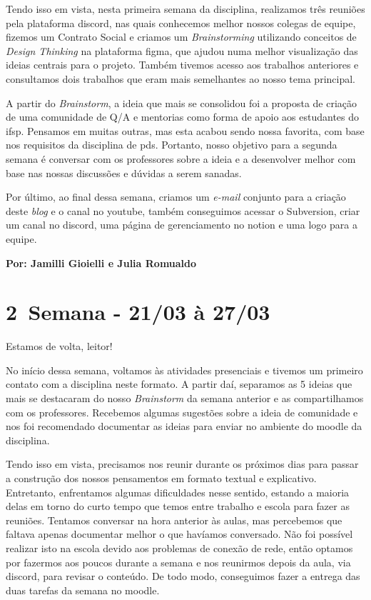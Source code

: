 Tendo isso em vista, nesta primeira semana da disciplina, realizamos três reuniões pela plataforma \gls{discord}, nas quais conhecemos melhor nossos colegas de equipe, fizemos um Contrato Social e criamos um \textsl{Brainstorming} utilizando conceitos de \textsl{Design Thinking} na plataforma \gls{figma}, que ajudou numa melhor visualização das ideias centrais para o projeto.  Também tivemos acesso aos trabalhos anteriores e consultamos dois trabalhos que eram mais semelhantes ao nosso tema principal. 

A partir do \textsl{Brainstorm}, a ideia que mais se consolidou foi a proposta de criação de uma comunidade de \acs{Q/A} e mentorias como forma de apoio aos estudantes do \acs{ifsp}. Pensamos em muitas outras, mas esta acabou sendo nossa favorita, com base nos requisitos da disciplina de \acs{pds}. Portanto, nosso objetivo para a segunda semana é conversar com os professores sobre a ideia e a desenvolver melhor com base nas nossas discussões e dúvidas a serem sanadas.

Por último, ao final dessa semana, criamos um \textsl{e-mail} conjunto para a criação deste \textsl{blog} e o canal no \gls{youtube}, também conseguimos acessar o Subversion, criar um canal no \gls{discord}, uma página de gerenciamento no \gls{notion} e uma logo para a equipe.


 \textbf{Por: Jamilli Gioielli e Julia Romualdo}

\section{2\textordfeminine \, Semana - 21/03 à 27/03}

Estamos de volta, leitor!

No início dessa semana, voltamos às atividades presenciais e tivemos um primeiro contato com a disciplina neste formato. A partir daí, separamos as 5 ideias que mais se destacaram do nosso \textsl{Brainstorm} da semana anterior e as compartilhamos com os professores. Recebemos algumas sugestões sobre a ideia de comunidade e nos foi recomendado documentar as ideias para enviar no ambiente do \gls{moodle} da disciplina. 

Tendo isso em vista, precisamos nos reunir durante os próximos dias para passar a construção dos nossos pensamentos em formato textual e explicativo. Entretanto, enfrentamos algumas dificuldades nesse sentido, estando a maioria delas em torno do curto tempo que temos entre trabalho e escola para fazer as reuniões. Tentamos conversar na hora anterior às aulas, mas percebemos que faltava apenas documentar melhor o que havíamos conversado. Não foi possível realizar isto na escola devido aos problemas de conexão de rede, então optamos por fazermos aos poucos durante a semana e nos reunirmos depois da aula, via \gls{discord}, para revisar o conteúdo. De todo modo, conseguimos fazer a entrega das duas tarefas da semana no \gls{moodle}.

